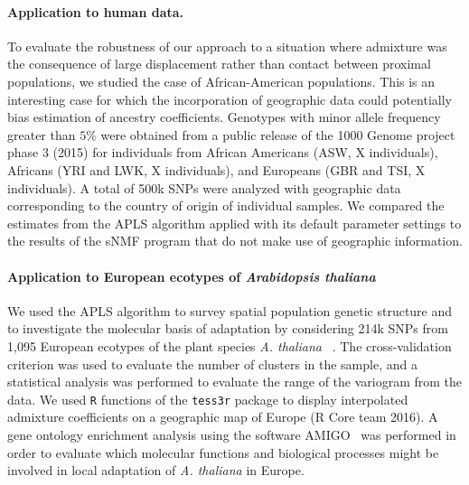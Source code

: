 \paragraph{Application to human data.} To evaluate the robustness of our
approach to a situation where admixture was the consequence of large
displacement rather than contact between proximal populations, we studied the
case of African-American populations. This is an interesting case for which the
incorporation of geographic data could potentially bias estimation of ancestry
coefficients. Genotypes with minor allele frequency greater than $5 \%$ were
obtained from a public release of the
1000 Genome project phase 3 (2015) for individuals from African Americans (ASW,
X individuals), Africans (YRI and LWK, X individuals), and Europeans (GBR and
TSI, X individuals). A total of 500k SNPs were analyzed with geographic data
corresponding to the country of origin of individual samples. We compared the
estimates from the APLS algorithm applied with its default parameter settings to
the results of the sNMF program that do not make use of geographic information.

\paragraph{Application to European ecotypes of {\it Arabidopsis thaliana}} We
used the APLS algorithm to survey spatial population genetic structure and to
investigate the molecular basis of adaptation by considering 214k SNPs from
1,095 European ecotypes of the plant species {\it A. thaliana}
~\citep{Horton2012}. The cross-validation criterion was used to evaluate the
number of clusters in the sample, and a statistical analysis was performed to
evaluate the range of the variogram from the data. We used {\tt R} functions of
the {\tt tess3r} package to display interpolated admixture coefficients on a
geographic map of Europe (R Core team 2016). A gene ontology enrichment analysis
using the software AMIGO~\citep{Carbon2009} was performed in order to evaluate
which molecular functions and biological processes might be involved in local
adaptation of {\it A. thaliana} in Europe.


